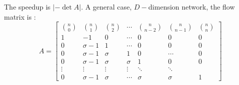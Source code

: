 The speedup is $\left | -\det A \right |$.
\newpage
A general case, $D-$dimension network, the flow matrix is :
\begin{equation*}
     {A = \left[ \begin{array}{ccccccc}
{n \choose 0} & {n \choose 1} & {n \choose 2}  & \cdots & {n \choose n-2} &{n \choose n-1} & {n \choose n} \\
1 & -1 & 0 & \cdots& 0 & 0 & 0\\
0 & \sigma-1 & 1 & \cdots & 0 & 0 & 0 \\
0 & \sigma-1 & \sigma & 1 & 0 & \cdots & 0 \\
0 & \sigma-1 & \sigma & \sigma & 1 & 0 & 0 \\
\vdots & \vdots & \vdots  &   \vdots & \ddots & \ddots\\
0 & \sigma-1 & \sigma & \cdots & \sigma & \sigma & 1
\end{array} 
\right ]}
\end{equation*}



